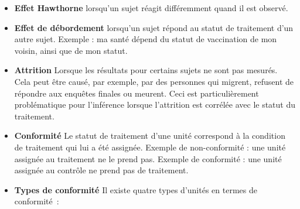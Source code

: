 \documentclass[
  12pt,
]{book}
\begin{document}
\begin{itemize}
\item
  \textbf{Effet Hawthorne} lorsqu'un sujet réagit différemment quand il est observé.
\item
  \textbf{Effet de débordement} lorsqu'un sujet répond au statut de traitement d'un autre sujet.
  Exemple : ma santé dépend du statut de vaccination de mon voisin, ainsi que de mon statut.
\item
  \textbf{Attrition} Lorsque les résultats pour certains sujets ne sont pas mesurés.
  Cela peut être causé, par exemple, par des personnes qui migrent, refusent de répondre aux enquêtes finales ou meurent.
  Ceci est particulièrement problématique pour l'inférence lorsque l'attrition est corrélée avec le statut du traitement.
\item
  \textbf{Conformité} Le statut de traitement d'une unité correspond à la condition de traitement qui lui a été assignée.
  Exemple de non-conformité : une unité assignée au traitement ne le prend pas.
  Exemple de conformité : une unité assignée au contrôle ne prend pas de traitement.
\item
  \textbf{Types de conformité} Il existe quatre types d'unités en termes de conformité~:


\end{itemize}
\end{document}
